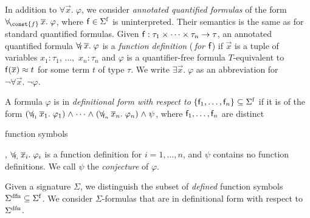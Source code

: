 In addition to $\forall \vec x.\; \varphi$,
we consider \emph{annotated quantified formulas} of the form
$\forallf{\const{f}} \vec x.\; \varphi$, where $\con{f} \in \sfuns{\Sigma}$ is
uninterpreted. Their
semantics is the same as for standard quantified formulas.
Given $\mathsf{f} : \tau_1 \times \cdots \times \tau_n \rightarrow \tau$,
an annotated
quantified formula $\forall_{\!\mathsf{f}\:} \overline{x}.\; \varphi$ is a \emph{function definition}
(\,\emph{for $\mathsf{f}$}\vthinspace) if $\vec x$ is a tuple of variables
$x_1 : \tau_1$, $\ldots,$ $x_n : \tau_n$
and $\varphi$ is a quantifier-free formula 
$T$-equivalent to $\mathsf{f}( \overline{x} ) \approx t$ for some term $t$ of type $\tau$.
We write $\exists
\vec x.\; \varphi$ as an abbreviation for $\neg \forall \vec x.\; \neg \varphi$.

\begin{definition}\rm
A formula $\varphi$ is in \emph{definitional form with respect to}
$\{ \con{f}_1, \ldots, \con{f}_n \} \subseteq \sfuns{\Sigma}$ if it is of the
form
%
%
$(\forallf{\con{f}_1} \vec x_1.\; \varphi_1) \wedge \cdots \wedge
(\forallf{\con{f}_n} \vec x_n.\; \varphi_n) \wedge \psi$,
%
where $\mathsf{f}_1, \ldots, \mathsf{f}_n$ are distinct\begin{longv} function symbols\end{longv},
$\forall_{\!\mathsf{f}_i\:} \overline{x}_i.\; \varphi_i$ is a function definition
for $i = 1, \ldots, n$,
%
and $\psi$ contains no function definitions.
We call $\psi$ the \emph{conjecture} of $\varphi$.
\end{definition}

Given a signature $\Sigma$, we distinguish the subset of \emph{defined}
function symbols $\sfundefs{\Sigma} \subseteq \sfuns{\Sigma}$.
We consider $\Sigma$-formulas that are in definitional form with respect to
$\sfundefs{\Sigma}$.

